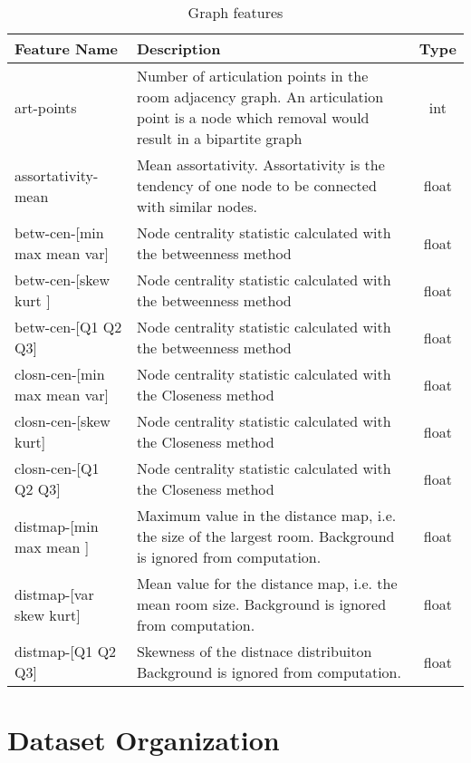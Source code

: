\begin{table}
	\begin{tabularx}{\textwidth}{| l | X | c |}
		\hline
		Feature Name & Description & Type \\
		\hline
		art-points	&	Number of articulation points in the room adjacency graph. An articulation point is a node which removal would result in a bipartite graph	&	int\\
		assortativity-mean	&	Mean assortativity. Assortativity is the tendency of one node to be connected with similar nodes.	&	float\\
		betw-cen-[min \textbar  max \textbar  mean \textbar  var]	&	Node centrality statistic calculated with the betweenness method	&	float\\
		betw-cen-[skew \textbar  kurt ]	&	Node centrality statistic calculated with the betweenness method	&	float\\
		betw-cen-[Q1 \textbar  Q2 \textbar  Q3]	&	Node centrality statistic calculated with the betweenness method	&	float\\
		closn-cen-[min \textbar  max \textbar  mean \textbar  var]	&	Node centrality statistic calculated with the Closeness method	&	float\\
		closn-cen-[skew \textbar  kurt]	&	Node centrality statistic calculated with the Closeness method	&	float\\
		closn-cen-[Q1 \textbar  Q2 \textbar  Q3]	&	Node centrality statistic calculated with the Closeness method	&	float\\
		distmap-[min \textbar  max \textbar  mean ]	&	Maximum value in the distance map, i.e. the size of the largest room. Background is ignored from computation.	&	float\\
		distmap-[var \textbar  skew \textbar  kurt]	&	Mean value for the distance map, i.e. the mean room size.  Background is ignored from computation.	&	float\\
		distmap-[Q1 \textbar  Q2 \textbar  Q3]	&	Skewness of the distnace distribuiton  Background is ignored from computation.	&	float\\
		\hline
	\end{tabularx}
	\caption[ Features: Graph ]{ Graph features }
	\label{tab:featuresgraph}
\end{table}	


\section{Dataset Organization}
\label{sec:DatasetOrganization}
